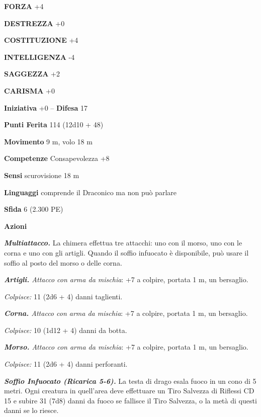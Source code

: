 \begin{multicols}{2}
\textbf{FORZA} +4

\textbf{DESTREZZA} +0

\textbf{COSTITUZIONE} +4

\textbf{INTELLIGENZA} -4

\textbf{SAGGEZZA} +2

\textbf{CARISMA} +0

\textbf{Iniziativa} +0 -- \textbf{Difesa} 17

\textbf{Punti Ferita} 114 (12d10 + 48)

\textbf{Movimento} 9 m, volo 18 m

\textbf{Competenze} Consapevolezza +8

\textbf{Sensi} scurovisione 18 m

\textbf{Linguaggi} comprende il Draconico ma non può parlare

\textbf{Sfida} 6 (2.300 PE)

\textbf{Azioni}

\emph{\textbf{Multiattacco.}} La chimera effettua tre attacchi: uno con  il morso, uno con le corna e uno con gli artigli. Quando il soffio infuocato  è disponibile, può usare il soffio al posto del morso o delle corna.

\emph{\textbf{Artigli.} Attacco con arma da mischia}: +7 a colpire,  portata 1 m, un bersaglio.

\emph{Colpisce:} 11 (2d6 + 4) danni taglienti.

\emph{\textbf{Corna.} Attacco con arma da mischia}: +7 a colpire,  portata 1 m, un bersaglio.

\emph{Colpisce:} 10 (1d12 + 4) danni da botta.

\emph{\textbf{Morso.} Attacco con arma da mischia}: +7 a colpire,  portata 1 m, un bersaglio.

\emph{Colpisce:} 11 (2d6 + 4) danni perforanti.

\emph{\textbf{Soffio Infuocato (Ricarica 5-6).}} La testa di drago esala  fuoco in un cono di 5 metri. Ogni creatura in quell'area deve  effettuare un Tiro Salvezza di Riflessi CD 15 e subire 31 (7d8) danni  da fuoco se fallisce il Tiro Salvezza, o la metà di questi danni se lo  riesce.


\end{multicols}
